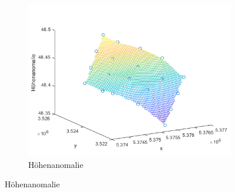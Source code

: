 \begin{figure}[ht]\centering
	\begin{subfigure}{.8\textwidth}
		\centering
		\includegraphics[width=.8\linewidth]{Images/Hoeheanomalie}  
		\caption{Höhenanomalie}
		\label{fig:sub-first}
	\end{subfigure}
\end{figure}

\newpage
